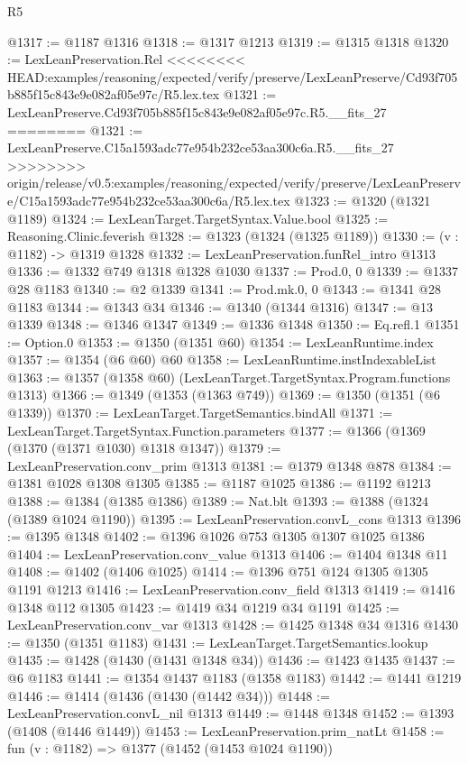 \begin{lexlean}{R5}
\begin{coremodule}
{{{{{{{{{{{{{{{{{{{{{{{{{{{{{{{{{{{{{{{{{{{{{{{{{{{{{{{{{{{{{{{{{{{{{{{{{{{{{{{{{{{{@1317 := @1187 @1316
@1318 := @1317 @1213
@1319 := @1315 @1318
@1320 := LexLeanPreservation.Rel
<<<<<<<< HEAD:examples/reasoning/expected/verify/preserve/LexLeanPreserve/Cd93f705b885f15c843e9e082af05e97c/R5.lex.tex
@1321 := LexLeanPreserve.Cd93f705b885f15c843e9e082af05e97c.R5.__fits_27
========
@1321 := LexLeanPreserve.C15a1593adc77e954b232ce53aa300c6a.R5.__fits_27
>>>>>>>> origin/release/v0.5:examples/reasoning/expected/verify/preserve/LexLeanPreserve/C15a1593adc77e954b232ce53aa300c6a/R5.lex.tex
@1323 := @1320 (@1321 @1189)
@1324 := LexLeanTarget.TargetSyntax.Value.bool
@1325 := Reasoning.Clinic.feverish
@1328 := @1323 (@1324 (@1325 @1189))
@1330 := (v : @1182) -> @1319 @1328
@1332 := LexLeanPreservation.funRel_intro @1313
@1336 := @1332 @749 @1318 @1328 @1030
@1337 := Prod.{0, 0}
@1339 := @1337 @28 @1183
@1340 := @2 @1339
@1341 := Prod.mk.{0, 0}
@1343 := @1341 @28 @1183
@1344 := @1343 @34
@1346 := @1340 (@1344 @1316)
@1347 := @13 @1339
@1348 := @1346 @1347
@1349 := @1336 @1348
@1350 := Eq.refl.{1}
@1351 := Option.{0}
@1353 := @1350 (@1351 @60)
@1354 := LexLeanRuntime.index
@1357 := @1354 (@6 @60) @60
@1358 := LexLeanRuntime.instIndexableList
@1363 := @1357 (@1358 @60) (LexLeanTarget.TargetSyntax.Program.functions @1313)
@1366 := @1349 (@1353 (@1363 @749))
@1369 := @1350 (@1351 (@6 @1339))
@1370 := LexLeanTarget.TargetSemantics.bindAll
@1371 := LexLeanTarget.TargetSyntax.Function.parameters
@1377 := @1366 (@1369 (@1370 (@1371 @1030) @1318 @1347))
@1379 := LexLeanPreservation.conv_prim @1313
@1381 := @1379 @1348 @878
@1384 := @1381 @1028 @1308 @1305
@1385 := @1187 @1025
@1386 := @1192 @1213
@1388 := @1384 (@1385 @1386)
@1389 := Nat.blt
@1393 := @1388 (@1324 (@1389 @1024 @1190))
@1395 := LexLeanPreservation.convL_cons @1313
@1396 := @1395 @1348
@1402 := @1396 @1026 @753 @1305 @1307 @1025 @1386
@1404 := LexLeanPreservation.conv_value @1313
@1406 := @1404 @1348 @11
@1408 := @1402 (@1406 @1025)
@1414 := @1396 @751 @124 @1305 @1305 @1191 @1213
@1416 := LexLeanPreservation.conv_field @1313
@1419 := @1416 @1348 @112 @1305
@1423 := @1419 @34 @1219 @34 @1191
@1425 := LexLeanPreservation.conv_var @1313
@1428 := @1425 @1348 @34 @1316
@1430 := @1350 (@1351 @1183)
@1431 := LexLeanTarget.TargetSemantics.lookup
@1435 := @1428 (@1430 (@1431 @1348 @34))
@1436 := @1423 @1435
@1437 := @6 @1183
@1441 := @1354 @1437 @1183 (@1358 @1183)
@1442 := @1441 @1219
@1446 := @1414 (@1436 (@1430 (@1442 @34)))
@1448 := LexLeanPreservation.convL_nil @1313
@1449 := @1448 @1348
@1452 := @1393 (@1408 (@1446 @1449))
@1453 := LexLeanPreservation.prim_natLt
@1458 := fun (v : @1182) => @1377 (@1452 (@1453 @1024 @1190))
}}}}}}}}}}}}}}}}}}}}}}}}}}}}}}}}}}}}}}}}}}}}}}}}}}}}}}}}}}}}}}}}}}}}}}}}}}}}}}}}}}}}
\end{coremodule}
\end{lexlean}
